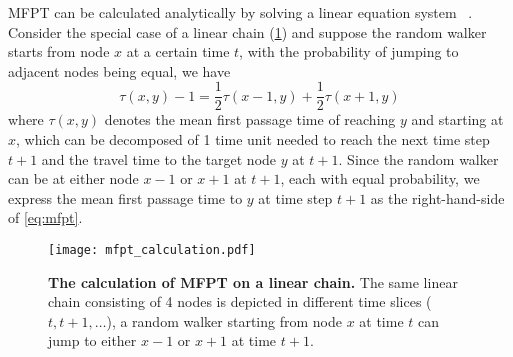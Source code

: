 MFPT can be calculated analytically by solving a linear equation system~%
\citep{Kampen2007}. Consider the special case of a linear chain 
(\ref{fig:mfpt_calculation}) and suppose the random walker starts from node 
$x$ at a certain time $t$, with the probability of jumping to adjacent nodes
being equal, we have
\begin{equation}
\tau(x,y) - 1 = \frac{1}{2}\tau(x-1,y) + \frac{1}{2}\tau(x+1,y)
\label{eq:mfpt}
\end{equation}
where $\tau(x,y)$ denotes the mean first passage time of reaching $y$ and 
starting at $x$, which can be decomposed of 1 time unit needed to reach the
next time step $t+1$ and the travel time to the target node $y$ at $t+1$.
Since the random walker can be at either node $x-1$ or $x+1$ at $t+1$, each
with equal probability, we express the mean first passage time to $y$ at
time step $t+1$ as the right-hand-side of \ref{eq:mfpt}.

\begin{figure}[!ht]
\begin{center}
\texttt{[image: mfpt\_calculation.pdf]}
\end{center}
\caption[MFPT calculation]{
{\bf The calculation of MFPT on a linear chain.}
The same linear chain consisting of 4 nodes is depicted in different time 
slices ($t,t+1,\ldots$), 
a random walker starting from node $x$ at time $t$ can jump to either $x-1$ 
or $x+1$ at time $t+1$.
}
\label{fig:mfpt_calculation}
\end{figure}

